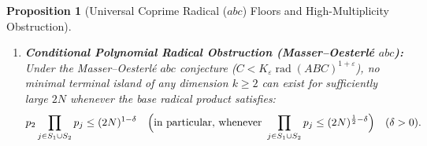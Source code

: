 \documentclass[11pt,a4paper]{article}
\newtheorem{proposition}[theorem]{Proposition}
\theoremstyle{definition}
\begin{document}
\begin{proposition}[Universal Coprime Radical ($abc$) Floors and High-Multiplicity Obstruction]
\begin{enumerate}
    \begin{equation}
    \label{eq:pasten_radical_floor}
    p_2 \prod_{j \in S_1 \cup S_2} p_j > \operatorname{rad}(ABC) > \exp\!\left( c_1 \frac{\bigl(\ln\ln(2N - p_1)\bigr)^2}{\ln\ln\ln(2N - p_1)} \right)
    \end{equation}
    and, for the largest prime in $I$ and in $\{p_2\} \cup \{p_j : j \in S_1 \cup S_2\}$,
    \begin{equation}
    \label{eq:pasten_prime_floor}
    p_k \ge \max\!\Bigl(p_2, \, \max_{j \in S_1 \cup S_2} p_j\Bigr) > c_2 \frac{\bigl(\ln\ln(2N - p_1)\bigr)^2}{\ln\ln\ln(2N - p_1)}
    \end{equation}
    (where $2N - \sqrt{2N} < 2N - p_1 < 2N$, so $\ln\ln(2N - p_1) = \ln\ln(2N) - o(1)$).
    \item \textbf{Conditional Polynomial Radical Obstruction (Masser--Oesterl\'e $abc$):} Under the Masser--Oesterl\'e $abc$ conjecture ($C < K_\varepsilon \operatorname{rad}(ABC)^{1+\varepsilon}$), no minimal terminal island of any dimension $k \ge 2$ can exist for sufficiently large $2N$ whenever the base radical product satisfies:
    \begin{equation}
    \label{eq:abc_conditional_regime}
    p_2 \prod_{j \in S_1 \cup S_2} p_j \le (2N)^{1 - \delta} \quad \Bigl(\text{in particular, whenever } \prod_{j \in S_1 \cup S_2} p_j \le (2N)^{\frac{1}{2} - \delta}\Bigr) \quad (\delta > 0).
    \end{equation}
\end{enumerate}
\end{proposition}
\end{document}
